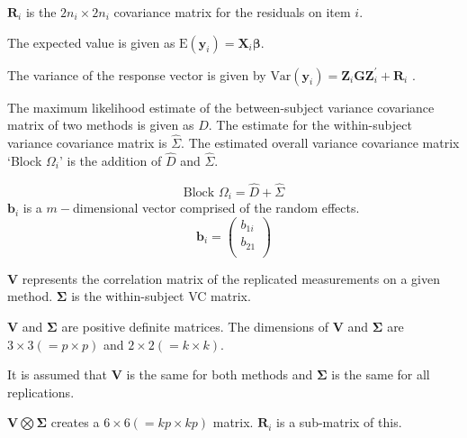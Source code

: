 \documentclass[12pt, a4paper]{report}
\theoremstyle{plain}
\theoremstyle{definition}
\theoremstyle{remark}
\begin{document}
$\boldsymbol{R}_i$ is the $2n_i \times  2n_i$ covariance matrix for the residuals on item $i$.

The expected value is given as $\mbox{E}(\boldsymbol{y}_i) = \boldsymbol{X}_i\boldsymbol{\beta}.$ \citep{hamlett}\\
\bigskip

The variance of the response vector is given by $\mbox{Var}(\boldsymbol{y}_i)  = \boldsymbol{Z}_i \boldsymbol{G} \boldsymbol{Z}_i^{\prime} + \boldsymbol{R}_i$ \citep{hamlett}.


The maximum likelihood estimate of the between-subject variance
covariance matrix of two methods is given as $D$. The estimate for
the within-subject variance covariance matrix is $\hat{\Sigma}$.
The estimated overall variance covariance matrix `Block $\Omega_{i}$' is the addition of $\hat{D}$ and $\hat{\Sigma}$.

\begin{equation}
\mbox{Block  }\Omega_{i} = \hat{D} + \hat{\Sigma}
\end{equation}
$\boldsymbol{b}_{i}$ is a $m-$dimensional vector comprised of
the random effects.
\begin{equation}
\boldsymbol{b}_{i} = \left( \begin{array}{c}
b_{1i} \\
b_{21}  \\
\end{array}\right)
\end{equation}


$\boldsymbol{V}$ represents the correlation matrix of the replicated measurements on a given method.
$\boldsymbol{\Sigma}$ is the within-subject VC matrix.\\
\bigskip


$\boldsymbol{V}$ and $\boldsymbol{\Sigma}$ are positive
definite matrices. The dimensions of $\boldsymbol{V}$ and
$\boldsymbol{\Sigma}$ are $3 \times 3 ( = p \times p )$ and $ 2 \times
2 (= k \times k)$.\\
\bigskip


It is assumed that $\boldsymbol{V}$ is the same for both methods and $\boldsymbol{\Sigma}$ is
the same for all replications.\\
\bigskip

$\boldsymbol{V} \bigotimes \boldsymbol{\Sigma}$ creates a $ 6 \times 6 ( = kp \times
kp)$ matrix.
$\boldsymbol{R}_{i}$ is a sub-matrix of this.\\
\bigskip

\end{document}
